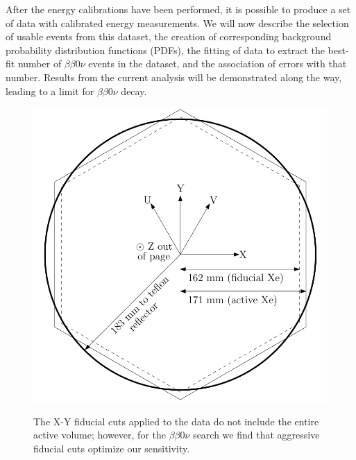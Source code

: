 After the energy calibrations have been performed, it is possible to produce a set of data with calibrated energy measurements.  We will now describe the selection of usable events from this dataset, the creation of corresponding background probability distribution functions (PDFs), the fitting of data to extract the best-fit number of $\beta\beta 0\nu$ events in the dataset, and the association of errors with that number.  Results from the current analysis will be demonstrated along the way, leading to a limit for $\beta\beta 0\nu$ decay.

\begin{figure}
\begin{center}
\includegraphics[keepaspectratio=true,width=\textwidth]{FidVolDiagram_Dissertation.pdf}
\end{center}
\renewcommand{\baselinestretch}{1}
\small\normalsize
\begin{quote}
\caption{The X-Y fiducial cuts applied to the data do not include the entire active volume; however, for the $\beta\beta 0\nu$ search we find that aggressive fiducial cuts optimize our sensitivity.}
\label{fig:FidVolDiagram}
\end{quote}
\end{figure}
\renewcommand{\baselinestretch}{2}
\small\normalsize

